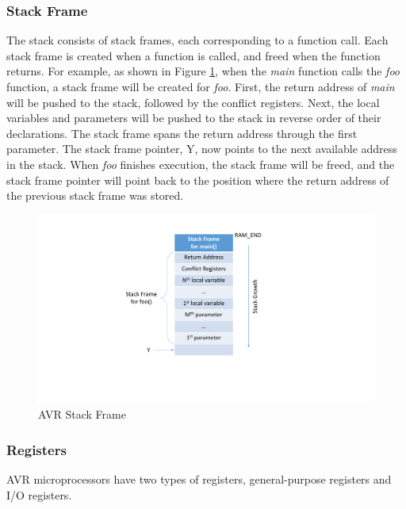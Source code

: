 \subsubsection{Stack Frame}
\vspace{-5pt}
The stack consists of stack frames, each corresponding to a function call. Each stack frame is created when a function is called, and freed when the function returns. For example, as shown in Figure \ref{fig:stack_frame}, when the \textit{main} function calls the \textit{foo} function, a stack frame will be created for \textit{foo}. First, the return address of \textit{main} will be pushed to the stack, followed by the conflict registers. Next, the local variables and parameters will be pushed to the stack in reverse order of their declarations. The stack frame spans the return address through the first parameter. The stack frame pointer, Y, now points to the next available address in the stack. When \textit{foo} finishes execution, the stack frame will be freed, and the stack frame pointer will point back to the position where the return address of the previous stack frame was stored.
\begin{figure}
\centering
\includegraphics[scale=0.55]{figures/stack_frame_v2.pdf}
\vspace{-10pt}
\caption{AVR Stack Frame}
\vspace{-5pt}
\label{fig:stack_frame}
\end{figure}

\vspace{-15pt}
\subsubsection{Registers}
\vspace{-5pt}
AVR microprocessors have two types of registers, general-purpose registers and I/O registers. 

